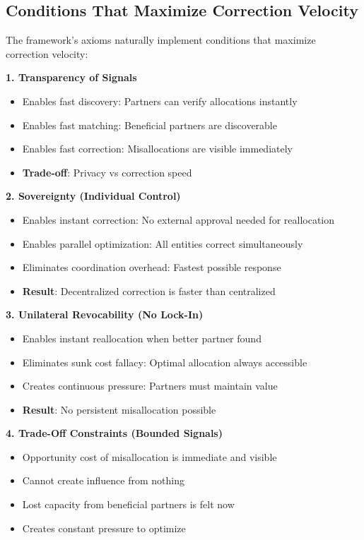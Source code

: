 \documentclass[11pt,a4paper]{article}
\theoremstyle{definition}
\theoremstyle{remark}
\begin{document}
\subsection{Conditions That Maximize Correction Velocity}

The framework's axioms naturally implement conditions that maximize correction velocity:

\textbf{1. Transparency of Signals}
\begin{itemize}
\item Enables fast discovery: Partners can verify allocations instantly
\item Enables fast matching: Beneficial partners are discoverable
\item Enables fast correction: Misallocations are visible immediately
\item \textbf{Trade-off}: Privacy vs correction speed
\end{itemize}

\textbf{2. Sovereignty (Individual Control)}
\begin{itemize}
\item Enables instant correction: No external approval needed for reallocation
\item Enables parallel optimization: All entities correct simultaneously
\item Eliminates coordination overhead: Fastest possible response
\item \textbf{Result}: Decentralized correction is faster than centralized
\end{itemize}

\textbf{3. Unilateral Revocability (No Lock-In)}
\begin{itemize}
\item Enables instant reallocation when better partner found
\item Eliminates sunk cost fallacy: Optimal allocation always accessible
\item Creates continuous pressure: Partners must maintain value
\item \textbf{Result}: No persistent misallocation possible
\end{itemize}

\textbf{4. Trade-Off Constraints (Bounded Signals)}
\begin{itemize}
\item Opportunity cost of misallocation is immediate and visible
\item Cannot create influence from nothing
\item Lost capacity from beneficial partners is felt now
\item Creates constant pressure to optimize
\end{itemize}
\end{document}
